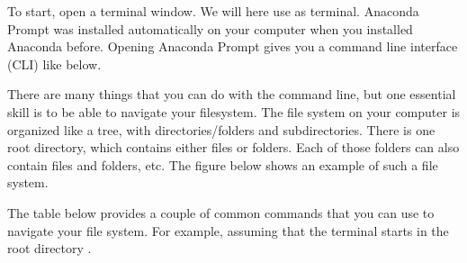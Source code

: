 \documentclass[letterpaper,10pt,english]{jupyterBook}
\begin{document}
\sphinxAtStartPar
To start, open a terminal window. We will here use  as terminal. Anaconda Prompt was installed automatically on your computer when you installed Anaconda before. Opening Anaconda Prompt gives you a command line interface (CLI) like below.

\sphinxAtStartPar
{}

\sphinxAtStartPar
There are many things that you can do with the command line, but one essential skill is to be able to navigate your filesystem. The file system on your computer is organized like a tree, with directories/folders and subdirectories. There is one root directory, which contains either files or folders. Each of those folders can also contain files and folders, etc. The figure below shows an example of such a file system.

\sphinxAtStartPar
{}

\sphinxAtStartPar
The table below provides a couple of common commands that you can use to navigate your file system. For example, assuming that the terminal starts in the root directory .
\end{document}
